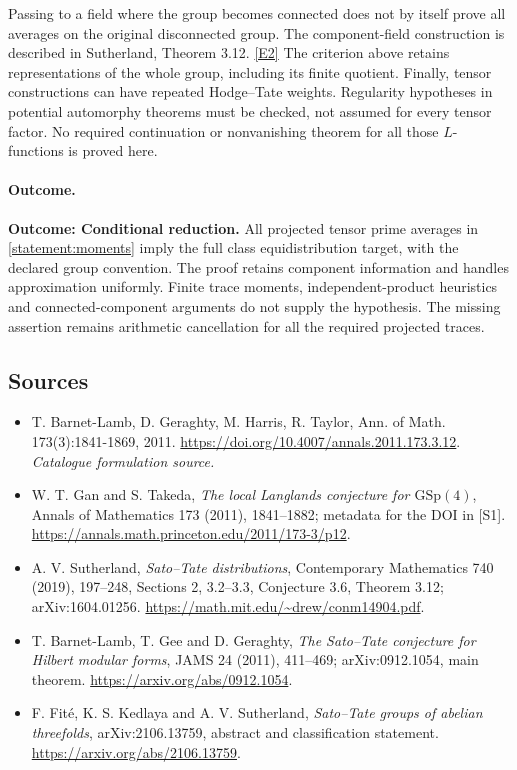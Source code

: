 \documentclass[11pt,a4paper]{article}
\newcommand{\eref}[2]{\hyperlink{extra:#1:#2}{[E#2]}}
\numberwithin{equation}{section}
\begin{document}
Passing to a field where the group becomes connected does not by itself
prove all averages on the original disconnected group. The component-field
construction is described in Sutherland, Theorem 3.12. \eref{statement}{2}
The criterion above retains representations of the whole group, including
its finite quotient. Finally, tensor constructions can have repeated
Hodge--Tate weights. Regularity hypotheses in potential automorphy theorems
must be checked, not assumed for every tensor factor. No required
continuation or nonvanishing theorem for all those $L$-functions is proved
here.

\paragraph{Outcome.}
\textbf{Outcome: Conditional reduction.}
All projected tensor prime averages in \eqref{statement:moments} imply the full
class equidistribution target, with the declared group convention. The
proof retains component information and handles approximation uniformly.
Finite trace moments, independent-product heuristics and connected-component
arguments do not supply the hypothesis. The missing assertion remains
arithmetic cancellation for all the required projected traces.

\subsection{Sources}
\begin{itemize}\raggedright
\item[\textnormal{[S1]}]\hypertarget{source:statement:1}{} T. Barnet-Lamb, D. Geraghty, M. Harris, R. Taylor, Ann. of Math. 173(3):1841-1869, 2011.
\url{https://doi.org/10.4007/annals.2011.173.3.12}.
{\small\textit{Catalogue formulation source.}}
\item[\textnormal{[E1]}]\hypertarget{extra:statement:1}{} W. T. Gan and S. Takeda,
\emph{The local Langlands conjecture for $\mathrm{GSp}(4)$}, Annals of
Mathematics 173 (2011), 1841--1882; metadata for the DOI in [S1].
\url{https://annals.math.princeton.edu/2011/173-3/p12}.
\item[\textnormal{[E2]}]\hypertarget{extra:statement:2}{} A. V. Sutherland,
\emph{Sato--Tate distributions}, Contemporary Mathematics 740 (2019),
197--248, Sections 2, 3.2--3.3, Conjecture 3.6, Theorem 3.12;
arXiv:1604.01256. \url{https://math.mit.edu/~drew/conm14904.pdf}.
\item[\textnormal{[E3]}]\hypertarget{extra:statement:3}{} T. Barnet-Lamb, T. Gee
and D. Geraghty, \emph{The Sato--Tate conjecture for Hilbert modular forms},
JAMS 24 (2011), 411--469; arXiv:0912.1054, main theorem.
\url{https://arxiv.org/abs/0912.1054}.
\item[\textnormal{[E4]}]\hypertarget{extra:statement:4}{} F. Fit\'e, K. S. Kedlaya
and A. V. Sutherland, \emph{Sato--Tate groups of abelian threefolds},
arXiv:2106.13759, abstract and classification statement.
\url{https://arxiv.org/abs/2106.13759}.

\end{itemize}
\end{document}
